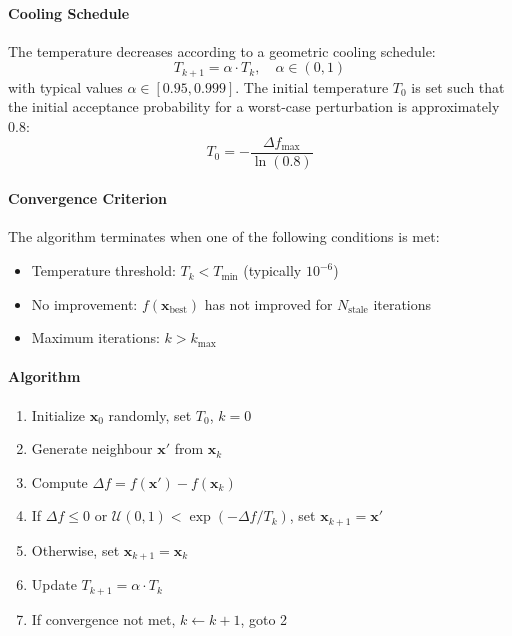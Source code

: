 \paragraph{Cooling Schedule}
The temperature decreases according to a geometric cooling schedule:
\begin{equation}
T_{k+1} = \alpha \cdot T_k, \quad \alpha \in (0, 1)
\end{equation}
with typical values $\alpha \in [0.95, 0.999]$. The initial temperature $T_0$ is set such that the initial acceptance probability for a worst-case perturbation is approximately $0.8$:
\begin{equation}
T_0 = -\frac{\Delta f_{\max}}{\ln(0.8)}
\end{equation}

\paragraph{Convergence Criterion}
The algorithm terminates when one of the following conditions is met:
\begin{itemize}
\item Temperature threshold: $T_k < T_{\min}$ (typically $10^{-6}$)
\item No improvement: $f(\mathbf{x}_{\text{best}})$ has not improved for $N_{\text{stale}}$ iterations
\item Maximum iterations: $k > k_{\max}$
\end{itemize}

\paragraph{Algorithm}
\begin{enumerate}
\item Initialize $\mathbf{x}_0$ randomly, set $T_0$, $k = 0$
\item Generate neighbour $\mathbf{x}'$ from $\mathbf{x}_k$
\item Compute $\Delta f = f(\mathbf{x}') - f(\mathbf{x}_k)$
\item If $\Delta f \leq 0$ or $\mathcal{U}(0,1) < \exp(-\Delta f / T_k)$, set $\mathbf{x}_{k+1} = \mathbf{x}'$
\item Otherwise, set $\mathbf{x}_{k+1} = \mathbf{x}_k$
\item Update $T_{k+1} = \alpha \cdot T_k$
\item If convergence not met, $k \leftarrow k+1$, goto 2
\end{enumerate}

